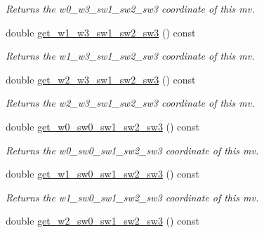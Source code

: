 \begin{DoxyCompactItemize}
\begin{DoxyCompactList}\small\item\em Returns the w0\-\_\-w3\-\_\-sw1\-\_\-sw2\-\_\-sw3 coordinate of this mv. \end{DoxyCompactList}\item 
\hypertarget{classe3ga_1_1mv_abed7780c0f1e1fa092e0c1a1f8fc4e3d}{double \hyperlink{classe3ga_1_1mv_abed7780c0f1e1fa092e0c1a1f8fc4e3d}{get\-\_\-w1\-\_\-w3\-\_\-sw1\-\_\-sw2\-\_\-sw3} () const }\label{classe3ga_1_1mv_abed7780c0f1e1fa092e0c1a1f8fc4e3d}

\begin{DoxyCompactList}\small\item\em Returns the w1\-\_\-w3\-\_\-sw1\-\_\-sw2\-\_\-sw3 coordinate of this mv. \end{DoxyCompactList}\item 
\hypertarget{classe3ga_1_1mv_a1ce025a87390b3d52a027f97e9d27d1d}{double \hyperlink{classe3ga_1_1mv_a1ce025a87390b3d52a027f97e9d27d1d}{get\-\_\-w2\-\_\-w3\-\_\-sw1\-\_\-sw2\-\_\-sw3} () const }\label{classe3ga_1_1mv_a1ce025a87390b3d52a027f97e9d27d1d}

\begin{DoxyCompactList}\small\item\em Returns the w2\-\_\-w3\-\_\-sw1\-\_\-sw2\-\_\-sw3 coordinate of this mv. \end{DoxyCompactList}\item 
\hypertarget{classe3ga_1_1mv_acc429276292c4b732eddb3336bd55a76}{double \hyperlink{classe3ga_1_1mv_acc429276292c4b732eddb3336bd55a76}{get\-\_\-w0\-\_\-sw0\-\_\-sw1\-\_\-sw2\-\_\-sw3} () const }\label{classe3ga_1_1mv_acc429276292c4b732eddb3336bd55a76}

\begin{DoxyCompactList}\small\item\em Returns the w0\-\_\-sw0\-\_\-sw1\-\_\-sw2\-\_\-sw3 coordinate of this mv. \end{DoxyCompactList}\item 
\hypertarget{classe3ga_1_1mv_a68e6e8c340e56ed1cd87ce0020435037}{double \hyperlink{classe3ga_1_1mv_a68e6e8c340e56ed1cd87ce0020435037}{get\-\_\-w1\-\_\-sw0\-\_\-sw1\-\_\-sw2\-\_\-sw3} () const }\label{classe3ga_1_1mv_a68e6e8c340e56ed1cd87ce0020435037}

\begin{DoxyCompactList}\small\item\em Returns the w1\-\_\-sw0\-\_\-sw1\-\_\-sw2\-\_\-sw3 coordinate of this mv. \end{DoxyCompactList}\item 
\hypertarget{classe3ga_1_1mv_a8109493d4191b50e61d2190207c3cd2b}{double \hyperlink{classe3ga_1_1mv_a8109493d4191b50e61d2190207c3cd2b}{get\-\_\-w2\-\_\-sw0\-\_\-sw1\-\_\-sw2\-\_\-sw3} () const }\label{classe3ga_1_1mv_a8109493d4191b50e61d2190207c3cd2b}


\end{DoxyCompactItemize}
